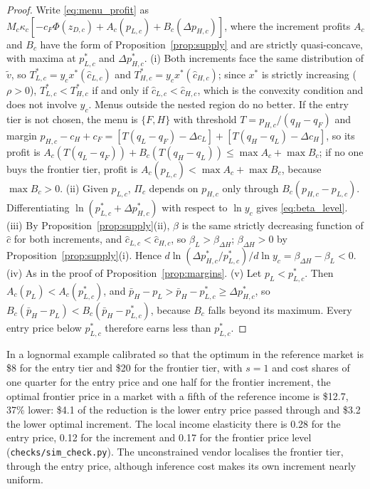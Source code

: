 \documentclass[11pt]{article}
\theoremstyle{definition}
\theoremstyle{remark}
\begin{document}
\begin{proof}
Write \eqref{eq:menu_profit} as $M_c\kappa_c[-c_F\Phi(z_{D,c})+A_c(p_{L,c})+B_c(\Delta p_{H,c})]$, where the increment profits $A_c$ and $B_c$ have the form of Proposition~\ref{prop:supply} and are strictly quasi-concave, with maxima at $p^*_{L,c}$ and $\Delta p^*_{H,c}$.
(i) Both increments face the same distribution of $\tilde v$, so $T^*_{L,c}=y_cx^*(\hat c_{L,c})$ and $T^*_{H,c}=y_cx^*(\hat c_{H,c})$; since $x^*$ is strictly increasing ($\rho>0$), $T^*_{L,c}<T^*_{H,c}$ if and only if $\hat c_{L,c}<\hat c_{H,c}$, which is the convexity condition and does not involve $y_c$. Menus outside the nested region do no better. If the entry tier is not chosen, the menu is $\{F,H\}$ with threshold $T=p_{H,c}/(q_H-q_F)$ and margin $p_{H,c}-c_H+c_F=[T(q_L-q_F)-\Delta c_L]+[T(q_H-q_L)-\Delta c_H]$, so its profit is $A_c(T(q_L-q_F))+B_c(T(q_H-q_L))\le\max A_c+\max B_c$; if no one buys the frontier tier, profit is $A_c(p_{L,c})<\max A_c+\max B_c$, because $\max B_c>0$.
(ii) Given $p_{L,c}$, $\Pi_c$ depends on $p_{H,c}$ only through $B_c(p_{H,c}-p_{L,c})$. Differentiating $\ln(p^*_{L,c}+\Delta p^*_{H,c})$ with respect to $\ln y_c$ gives \eqref{eq:beta_level}.
(iii) By Proposition~\ref{prop:supply}(ii), $\beta$ is the same strictly decreasing function of $\hat c$ for both increments, and $\hat c_{L,c}<\hat c_{H,c}$, so $\beta_L>\beta_{\Delta H}$; $\beta_{\Delta H}>0$ by Proposition~\ref{prop:supply}(i). Hence $d\ln(\Delta p^*_{H,c}/p^*_{L,c})/d\ln y_c=\beta_{\Delta H}-\beta_L<0$.
(iv) As in the proof of Proposition~\ref{prop:margins}.
(v) Let $p_L<p^*_{L,c}$. Then $A_c(p_L)<A_c(p^*_{L,c})$, and $\bar p_H-p_L>\bar p_H-p^*_{L,c}\ge\Delta p^*_{H,c}$, so $B_c(\bar p_H-p_L)<B_c(\bar p_H-p^*_{L,c})$, because $B_c$ falls beyond its maximum. Every entry price below $p^*_{L,c}$ therefore earns less than $p^*_{L,c}$.
\end{proof}

In a lognormal example calibrated so that the optimum in the reference market is \$8 for the entry tier and \$20 for the frontier tier, with $s=1$ and cost shares of one quarter for the entry price and one half for the frontier increment, the optimal frontier price in a market with a fifth of the reference income is \$12.7, 37\% lower: \$4.1 of the reduction is the lower entry price passed through and \$3.2 the lower optimal increment. The local income elasticity there is 0.28 for the entry price, 0.12 for the increment and 0.17 for the frontier price level (\nolinkurl{checks/sim_check.py}). The unconstrained vendor localises the frontier tier, through the entry price, although inference cost makes its own increment nearly uniform.
\end{document}
